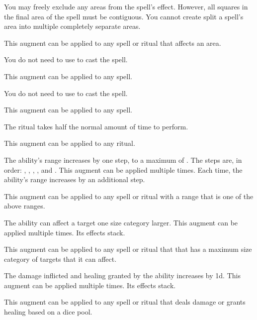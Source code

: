              You may freely exclude any areas from the spell's effect.
            However, all squares in the final area of the spell must be contiguous.
            You cannot create split a spell's area into multiple completely separate areas.
            \par This augment can be applied to any spell or ritual that affects an area.

             You do not need to use  to cast the spell.
            \par This augment can be applied to any spell.

             You do not need to use  to cast the spell.
            \par This augment can be applied to any spell.

             The ritual takes half the normal amount of time to perform.
            \par This augment can be applied to any ritual.

             The ability's range increases by one step, to a maximum of \rngext.
            The steps are, in order: \rngtouch, \rngclose, \rngmed, \rnglong, and \rngext.
            This augment can be applied multiple times.
            Each time, the ability's range increases by an additional step.
            \par This augment can be applied to any spell or ritual with a range that is one of the above ranges.

             The ability can affect a target one size category larger.
            This augment can be applied multiple times.
            Its effects stack.
            \par This augment can be applied to any spell or ritual that that has a maximum size category of targets that it can affect.

             The damage inflicted and healing granted by the ability increases by \plus1d.
            This augment can be applied multiple times.
            Its effects stack.
            \par This augment can be applied to any spell or ritual that deals damage or grants healing based on a dice pool.

